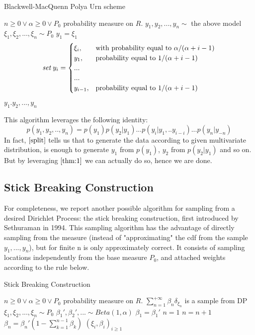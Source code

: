 \documentclass{article}
\begin{document}
\begin{minipage}{.8\linewidth}
\label{b:mc:algo}
\begin{algorithm}[H]
\caption{Blackwell-MacQuenn Polya Urn scheme}
\begin{algorithmic} 
\REQUIRE $n \geq 0 \vee \alpha \geq 0 \vee P_0$ probability measure on $R$.
\ENSURE $y_1, y_2, ..., y_n\sim$ the above model
\STATE $\xi_1, \xi_2,..., \xi_n\sim P_0$
\STATE $y_1 = \xi_1$
\STATE \[\textit{set\;} y_i =\begin{cases} \xi_i , & \mbox{with probability equal to $\alpha/(\alpha+i-1)$}  \\  
 y_1, & \mbox{probability equal to $1/(\alpha+i-1)$} \\
... \\
... \\
 y_{i-1}, & \mbox{probability equal to $1/(\alpha+i-1)$}  \end{cases} \]
\ENDFOR
\RETURN $y_1. y_2,..., y_n$
\end{algorithmic}
\end{algorithm}
\end{minipage}

This algorithm leverages the following identity:
\begin{equation}
\label{split}
    p(y_1, y_2,.., y_n) = p(y_1)p(y_2|y_1)...p(y_i|y_1,..y_{i-i})...p(y_n|y_{-n})
\end{equation}
In fact, $\eqref{split}$ tells us that to generate the data according to given multivariate distribution, is enough to generate $y_1$ from $p(y_1)$, $y_2$ from $p(y_2|y_1)$ and so on. But by leveraging $\ref{thm:1}$ we can actually do so, hence we are done.

\subsection{Stick Breaking Construction}
For completeness, we report another possible algorithm for sampling from a desired Dirichlet Process: the stick breaking construction, first introduced by Sethuraman in 1994. This sampling algorithm has the advantage of directly sampling from the measure (instead of "approximating" the cdf from the sample $y_1,..., y_n$), but for finite n is only approximately correct. It consists of sampling locations independently from the base measure $P_0$, and attached weights according to the rule below.

\begin{minipage}{.8\linewidth}
\begin{algorithm}[H]
\caption{Stick Breaking Construction}
\begin{algorithmic} 
\REQUIRE $n \geq 0 \vee \alpha \geq 0 \vee P_0$ probability measure on $R$.
\ENSURE $\sum_{n=1}^{+\infty} \beta_n \delta_{\xi_n}$ is a sample from DP
\STATE $\xi_1, \xi_2,..., \xi_n\sim P_0$
\STATE $\beta_1',\beta_2',... \sim Beta(1, \alpha)$
\STATE $\beta_1 = \beta_1'$
\STATE $n = 1$
\STATE $n = n+1$
\STATE $\beta_n = \beta_n' (1-\sum_{k=1}^{n-1} \beta_k)$
\ENDWHILE
\RETURN $(\xi_i, \beta_i)_{i\ge1}$
\end{algorithmic}
\end{algorithm}
\end{minipage}
\end{document}
